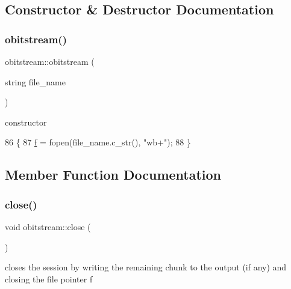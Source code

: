 \subsection{Constructor \& Destructor Documentation}
\mbox{\label{classobitstream_a99e4f20344a99c1e8d892eb0c28b3daa}} 
\subsubsection{\texorpdfstring{obitstream()}{obitstream()}}
{\footnotesize\ttfamily obitstream\+::obitstream (\begin{DoxyParamCaption}\item[{string}]{file\+\_\+name }\end{DoxyParamCaption})\hspace{0.3cm}{\ttfamily [inline]}}



constructor 


\begin{DoxyCode}
86                               \{
87     \hyperlink{classobitstream_ac589d74745217748c888ae777ab324a7}{f} = fopen(file\_name.c\_str(), \textcolor{stringliteral}{"wb+"});
88   \}
\end{DoxyCode}


\subsection{Member Function Documentation}
\mbox{\label{classobitstream_a6d76dbba302e1181fbc9609072a4c2a0}} 
\subsubsection{\texorpdfstring{close()}{close()}}
{\footnotesize\ttfamily void obitstream\+::close (\begin{DoxyParamCaption}{ }\end{DoxyParamCaption})}



closes the session by writing the remaining chunk to the output (if any) and closing the file pointer f 



